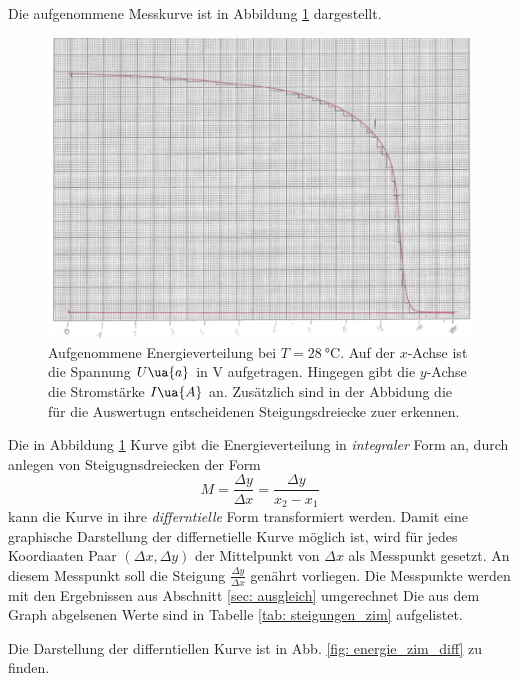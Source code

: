Die aufgenommene Messkurve ist in Abbildung \ref{fig: messkurve_energie_zim} dargestellt.
\begin{figure}
  \centering
  \includegraphics[width=0.8 \textwidth]{./pics/energieverteilung_zimmer.png}
  \caption{Aufgenommene Energieverteilung bei $T=\SI{28}{\celsius}$. Auf der $x$-Achse ist die Spannung $U\ua{a}$ in $\si{\volt}$ aufgetragen.
          Hingegen gibt die $y$-Achse die Stromstärke $I\ua{A}$ an. Zusätzlich sind in der Abbidung die für die Auswertugn entscheidenen Steigungsdreiecke zuer erkennen.}
  \label{fig: messkurve_energie_zim}
\end{figure}
Die in Abbildung \ref{fig: messkurve_energie_zim} Kurve gibt die Energieverteilung in \emph{integraler} Form an, durch anlegen von Steigugnsdreiecken der Form
\begin{equation}
  \label{eq:steigung}
    M=\frac{\Delta y}{\Delta x}=\frac{\Delta y}{x_2-x_1}
\end{equation}
kann die Kurve in ihre \emph{differntielle} Form transformiert werden.
Damit eine graphische Darstellung der differnetielle Kurve möglich ist, wird für jedes Koordiaaten Paar $(\Delta x,\Delta y)$ der Mittelpunkt
von $\Delta x$ als Messpunkt gesetzt. An diesem Messpunkt soll die Steigung $\frac{\Delta y}{\Delta x}$ genährt vorliegen.
Die Messpunkte werden mit den Ergebnissen aus Abschnitt \ref{sec: ausgleich} umgerechnet
Die aus dem Graph abgelsenen Werte sind in Tabelle \ref{tab: steigungen_zim} aufgelistet.

Die Darstellung der differntiellen Kurve ist in Abb. \ref{fig: energie_zim_diff} zu finden.

